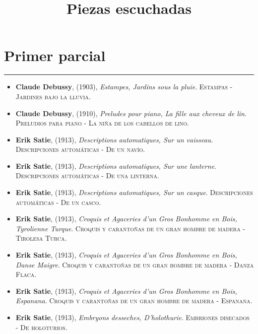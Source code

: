 \documentclass[paper=a4, fontsize=11pt, spanish]{scrartcl}
\date{}
\title{	
\normalfont \normalsize 
\huge  Piezas escuchadas \\
\horrule{2pt}
}
\numberwithin{equation}{section} %
\numberwithin{figure}{section} %
\numberwithin{table}{section} %
\newcommand{\horrule}[1]{\rule{\linewidth}{#1}}
\begin{document}
\maketitle

\section{Primer parcial}
\horrule{0.5pt}

\begin{itemize}

\item \textbf{Claude Debussy}, (1903), \textit{Estampes, Jardins sous la pluie}.\textsc{ Estampas - Jardines bajo la lluvia}. %
\item \textbf{Claude Debussy}, (1910), \textit{Preludes pour piano, La fille aux cheveux de lin}.\textsc{ Preludios para piano - La niña de los cabellos de lino}. %
\item \textbf{Erik Satie}, (1913), \textit{Descriptions automatiques, Sur un vaisseau}. \textsc{ Descripciones automáticas - De un navío}. %
\item \textbf{Erik Satie}, (1913), \textit{Descriptions automatiques, Sur une lanterne}.\textsc{ Descripciones automáticas - De una linterna}. %
\item \textbf{Erik Satie}, (1913), \textit{Descriptions automatiques, Sur un casque}.\textsc{ Descripciones automáticas - De un casco}. %
\item \textbf{Erik Satie}, (1913), \textit{Croquis et Agaceries d'un Gros Bonhomme en Bois, Tyrolienne Turque}. \textsc{ Croquis y carantoñas de un gran hombre de madera - Tirolesa Turca}. %
\item \textbf{Erik Satie}, (1913), \textit{Croquis et Agaceries d'un Gros Bonhomme en Bois, Danse Maigre}. \textsc{ Croquis y carantoñas de un gran hombre de madera - Danza Flaca}. %
\item \textbf{Erik Satie}, (1913), \textit{Croquis et Agaceries d'un Gros Bonhomme en Bois, Espanana}. \textsc{ Croquis y carantoñas de un gran hombre de madera - Espanana}. %
\item \textbf{Erik Satie}, (1913), \textit{Embryons desseches, D'holothurie}.\textsc{ Embriones disecados - De holoturios}. %

\end{itemize}
\end{document}
